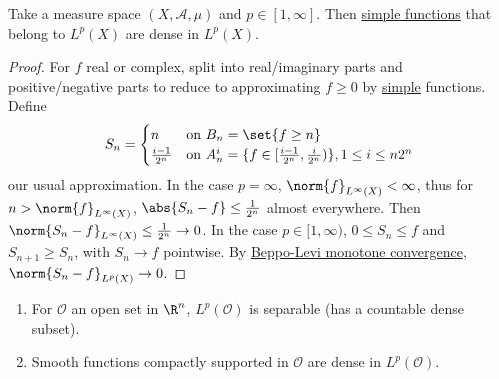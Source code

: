 \documentclass[twoside]{article}
\begin{document}
\begin{thm}
    Take a measure space $(X, \mathscr{A}, \mu)$ and $p \in [1, \infty]$. Then \hyperlink{def:simple}{simple functions} that belong to \hyperlink{def:lpspace}{$L^p(X)$} are dense in $L^p(X)$.
\end{thm}
\begin{proof}
    For $f$ real or complex, split into real/imaginary parts and positive/negative parts to reduce to approximating $f \geq 0$ by \hyperlink{def:simple}{simple} functions.
    Define
    \begin{equation*}
        S_n =
        \begin{cases}
            n & \text{on } B_n = \set{f \geq n} \\
            \frac{i-1}{2^n} & \text{on } A_n^i = \{f \in [\frac{i-1}{2^n}, \frac{i}{2^n})\}, 1 \leq i \leq n 2^n
        \end{cases}
    \end{equation*}
    our usual approximation.
    In the case $p=\infty$, $\norm{f}_{L^\infty(X)} < \infty$, thus for $n > \norm{f}_{L^\infty(X)}$, $\abs{S_n-f} \leq \frac{1}{2^n}$ almost everywhere. Then $\norm{S_n-f}_{L^\infty(X)} \leq \frac{1}{2^n} \to 0$.
    In the case $p \in [1, \infty)$, $0 \leq S_n \leq f$ and $S_{n+1} \geq S_n$, with $S_n \to f$ pointwise. By \hyperlink{thm:Beppo}{Beppo-Levi monotone convergence}, $\norm{S_n - f}_{L^p(X)} \to 0$.
\end{proof}

\begin{thm}[Density-separability of $L^p(\R^n)$, $p \in [1, \infty)$]
    \leavevmode
    \begin{enumerate}[label=(\arabic*)]
        \item For $\mathcal{O}$ an open set in $\R^n$, $L^p(\mathcal{O})$ is separable (has a countable dense subset).
        \item Smooth functions compactly supported in $\mathcal{O}$ are dense in $L^p(\mathcal{O})$.
    \end{enumerate}
\end{thm}
\end{document}
